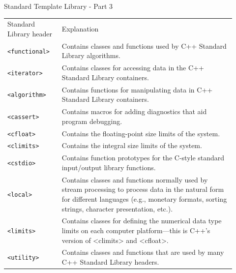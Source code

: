 \documentclass[10pt]{beamer}
\begin{document}
\begin{frame}{Standard Template Library - Part 3}
	\centering\scriptsize\renewcommand{\arraystretch}{1.8}
	\begin{tabular}{p{0.22\linewidth} p{0.7\linewidth}}
		
		\rowcolor{cyan}\color{white} Standard Library header & \color{white} Explanation\\
		
		\rowcolor{lightcyan} \texttt{<functional>} & Contains classes and functions used by C++ Standard Library algorithms. \\	
		\rowcolor{lightcyan} \texttt{<iterator>} & Contains classes for accessing data in the C++ Standard Library containers. \\
		\rowcolor{lightcyan} \texttt{<algorithm>} & Contains functions for manipulating data in C++ Standard Library containers. \\
		\rowcolor{lightcyan} \texttt{<cassert>} & Contains macros for adding diagnostics that aid program debugging. \\
		\rowcolor{lightcyan} \texttt{<cfloat>} & Contains the floating-point size limits of the system. \\
		\rowcolor{lightcyan} \texttt{<climits>} & Contains the integral size limits of the system. \\
		\rowcolor{lightcyan} \texttt{<cstdio>} & Contains function prototypes for the C-style standard input/output library functions. \\
		\rowcolor{lightcyan} \texttt{<local>} & Contains classes and functions normally used by stream processing to		process data in the natural form for different languages (e.g., monetary		formats, sorting strings, character presentation, etc.). \\
		\rowcolor{lightcyan} \texttt{<limits>} & Contains classes for defining the numerical data type limits on each	computer platform—this is C++’s version of <climits> and <cfloat>. \\
		\rowcolor{lightcyan} \texttt{<utility>} & Contains classes and functions that are used by many C++ Standard		Library headers.
	\end{tabular}
\end{frame}
\end{document}
